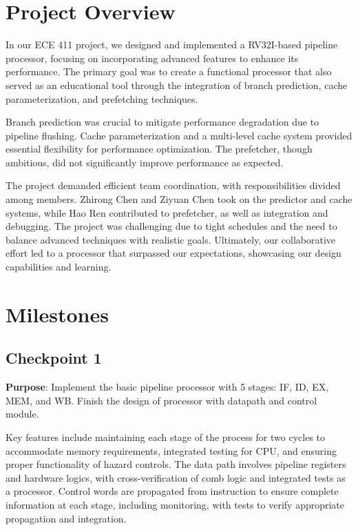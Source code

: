 \documentclass[12pt, a4paper]{article}
\begin{document}



    \section{Project Overview}

    In our ECE 411 project, we designed and implemented a RV32I-based pipeline processor, focusing on incorporating advanced features to enhance its performance. The primary goal was to create a functional processor that also served as an educational tool through the integration of branch prediction, cache parameterization, and prefetching techniques.

    Branch prediction was crucial to mitigate performance degradation due to pipeline flushing. Cache parameterization and a multi-level cache system provided essential flexibility for performance optimization. The prefetcher, though ambitious, did not significantly improve performance as expected.
    
    The project demanded efficient team coordination, with responsibilities divided among members. Zhirong Chen and Ziyuan Chen took on the predictor and cache systems, while Hao Ren contributed to prefetcher, as well as integration and debugging. The project was challenging due to tight schedules and the need to balance advanced techniques with realistic goals. Ultimately, our collaborative effort led to a processor that surpassed our expectations, showcasing our design capabilities and learning.





    \section{Milestones}

    \subsection{Checkpoint 1}
    \textbf{Purpose}: Implement the basic pipeline processor with 5 stages: IF, ID, EX, MEM, and WB. Finish the design of processor with datapath and control module. 
    
    Key features include maintaining each stage of the process for two cycles to accommodate memory requirements, integrated testing for CPU, and ensuring proper functionality of hazard controls. The data path involves pipeline registers and hardware logics, with cross-verification of comb logic and integrated tests as a processor. Control words are propagated from instruction to ensure complete information at each stage, including monitoring, with tests to verify appropriate propagation and integration.
\end{document}
